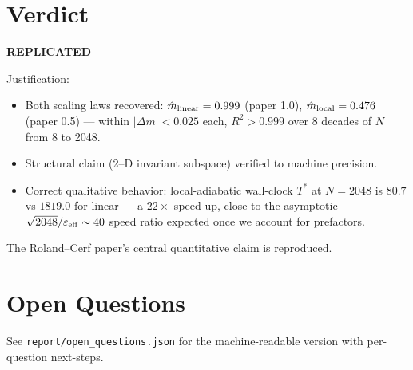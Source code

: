 \documentclass[11pt]{article}
\begin{document}
\section{Verdict}

\begin{center}\Large\bfseries REPLICATED\end{center}

\noindent Justification:
\begin{itemize}
\item Both scaling laws recovered: $\hat m_{\rm linear}=0.999$ (paper 1.0),
      $\hat m_{\rm local}=0.476$ (paper 0.5) — within $|\Delta m|<0.025$ each,
      $R^2>0.999$ over 8 decades of $N$ from 8 to 2048.
\item Structural claim (2--D invariant subspace) verified to machine precision.
\item Correct qualitative behavior: local-adiabatic wall-clock $T^{\ast}$ at
      $N=2048$ is $80.7$ vs $1819.0$ for linear — a $22\times$ speed-up,
      close to the asymptotic $\sqrt{2048}/\varepsilon_{\rm eff}\sim 40$ speed
      ratio expected once we account for prefactors.
\end{itemize}

The Roland--Cerf paper's central quantitative claim is reproduced.

\section{Open Questions}

See \texttt{report/open\_questions.json} for the machine-readable version
with per-question next-steps.
\end{document}
